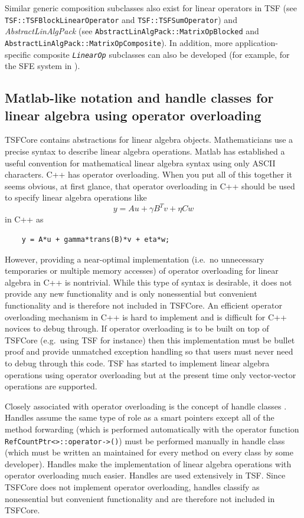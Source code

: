Similar generic composition subclasses also exist for linear operators
in TSF (see \texttt{TSF\-::TSF\-Block\-Linear\-Operator} and
\texttt{TSF\-::TSF\-Sum\-Operator}) and \textit{AbstractLinAlgPack} (see
\texttt{Abstract\-Lin\-Alg\-Pack\-::Matrix\-Op\-Blocked} and
\texttt{Abstract\-Lin\-Alg\-Pack\-::Matrix\-Op\-Composite}).  In addition, more
application-specific composite \texttt{\textit{LinearOp}} subclasses
can also be developed (for example, for the SFE system in
\cite{ref:sfe}).

%
\subsection{Matlab-like notation and handle classes for linear algebra
using operator overloading}
\label{tsfcore:sec:operator_overloading}
%

TSFCore contains abstractions for linear algebra objects.  Mathematicians
use a precise syntax to describe linear algebra operations.  Matlab
\cite{ref:matlab} has established a useful convention for mathematical
linear algebra syntax using only ASCII characters.  C++ has operator
overloading.  When you put all of this together it seems obvious, at
first glance, that operator overloading in C++ should be used to
specify linear algebra operations like
%
\[
y = A u + \gamma B^T v + \eta C w
\]
%
in C++ as
%
\begin{verbatim}
    y = A*u + gamma*trans(B)*v + eta*w;
\end{verbatim}

\noindent However, providing a near-optimal implementation (i.e.~no unnecessary
temporaries or multiple memory accesses) of operator overloading for
linear algebra in C++ is nontrivial.  While this type of syntax is
desirable, it does not provide any new functionality and is only
nonessential but convenient functionality and is therefore not included in TSFCore.
An efficient operator overloading mechanism in C++ is hard to
implement and is difficult for C++ novices to debug through.  If
operator overloading is to be built on top of TSFCore (e.g.~using TSF for
instance) then this implementation must be bullet proof and provide
unmatched exception handling so that users must never need to debug
through this code.  TSF has started to implement linear algebra
operations using operator overloading but at the present time only
vector-vector operations are supported.

Closely associated with operator overloading is the concept of handle
classes \cite{ref:advanced_c++_coplien}.  Handles assume the same type
of role as a smart pointers except all of the method forwarding (which
is performed automatically with the operator function
\texttt{RefCountPtr<>\-::operator->()}) must be performed manually
in handle class (which must be written an maintained for every method
on every class by some developer).  Handles make the implementation of
linear algebra operations with operator overloading much easier.
Handles are used extensively in TSF.  Since TSFCore does not implement
operator overloading, handles classify as nonessential but convenient
functionality and are therefore not included in TSFCore.

